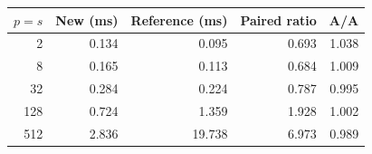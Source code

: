 \begin{tabular}{rrrrr}
\toprule
$p=s$ & New (ms) & Reference (ms) & Paired ratio & A/A \\
\midrule
2 & 0.134 & 0.095 & 0.693 & 1.038 \\
8 & 0.165 & 0.113 & 0.684 & 1.009 \\
32 & 0.284 & 0.224 & 0.787 & 0.995 \\
128 & 0.724 & 1.359 & 1.928 & 1.002 \\
512 & 2.836 & 19.738 & 6.973 & 0.989 \\
\bottomrule
\end{tabular}
